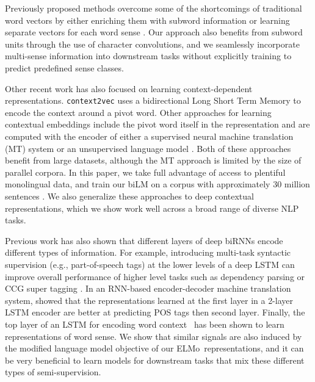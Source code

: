 \documentclass[11pt,a4paper]{article}
\newcommand{\ELMO}{ELMo}
\begin{document}
Previously proposed methods overcome some of the shortcomings of traditional word vectors by either enriching them with subword information \citep[e.g., ][]{Wieting2016CharagramEW,Bojanowski2017EnrichingWV} or learning separate vectors for each word sense \citep[e.g., ][]{Neelakantan2014EfficientNE}.
Our approach also benefits from subword units through the use of character convolutions, and we seamlessly incorporate multi-sense information into downstream tasks without explicitly training to predict predefined sense classes.



Other recent work has also focused on learning context-dependent representations.
\texttt{context2vec} \citep{Melamud2016context2vecLG} uses a bidirectional Long Short Term Memory \citep[LSTM; ][]{LSTM:Hochreiter1997} to encode the context around a pivot word. Other approaches for learning contextual embeddings include the pivot word itself in the representation and are computed with the encoder of either a supervised neural machine translation (MT) system \citep[CoVe; ][]{McCann2017LearnedIT} or an unsupervised language model \citep{Peters2017SemisupervisedST}.
Both of these approaches benefit from large datasets, although the MT approach is limited by the size of parallel corpora.
In this paper, we take full advantage of access to plentiful monolingual data, and train our biLM 
on a corpus with approximately 30 million sentences \citep{Chelba2014OneBW}.
We also generalize these approaches to deep contextual representations, which we show work well across a broad range of diverse NLP tasks. 

Previous work has also shown that different layers of deep biRNNs encode different types of information.
For example, introducing multi-task syntactic supervision (e.g., part-of-speech tags) at the lower levels of a deep LSTM can improve overall performance of higher level tasks such as dependency parsing \citep{joint-many-iclr07} or CCG super tagging \citep{Sgaard2016DeepML}.
In an RNN-based encoder-decoder machine translation system, \citet{Belinkov2017WhatDN} showed that the representations learned at the first layer
in a 2-layer LSTM encoder are better at predicting POS tags then second layer.
Finally, the top layer of an LSTM for encoding word context~\citep{Melamud2016context2vecLG} has been shown to learn representations of word sense. We show that similar signals are also induced by the modified language model objective of our \ELMO\ representations, and it can be very beneficial to learn models for downstream tasks that mix these different types of semi-supervision. 
\end{document}
